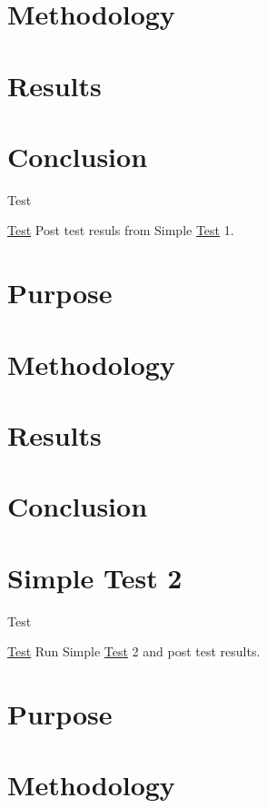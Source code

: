 \section*{Methodology}

\section*{Results}

\section*{Conclusion}

\begin{DoxyRefDesc}{Test}
\item[\hyperlink{test__test000014}{Test}]Post test resuls from Simple \hyperlink{class_test}{Test} 1.\end{DoxyRefDesc}


\section*{Purpose}

\section*{Methodology}

\section*{Results}

\section*{Conclusion}\hypertarget{SimpleTest2}{}\section{Simple Test 2}\label{SimpleTest2}
\begin{DoxyRefDesc}{Test}
\item[\hyperlink{test__test000006}{Test}]Run Simple \hyperlink{class_test}{Test} 2 and post test results.\end{DoxyRefDesc}


\section*{Purpose}

\section*{Methodology}

